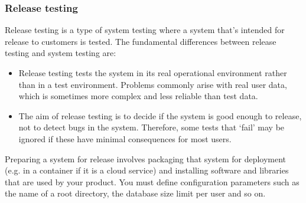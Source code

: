 \documentclass[10pt,a4paper]{report}
\begin{document}
\subsubsection{Release testing}
Release testing is a type of system testing where a system that’s intended for release to customers is tested. The fundamental differences between release testing and system testing are:
\begin{itemize}
	\item Release testing tests the system in its real operational environment rather than in a
	test environment. Problems commonly arise with real user data, which is sometimes
	more complex and less reliable than test data.
	\item The aim of release testing is to decide if the system is good enough to release, not to
	detect bugs in the system. Therefore, some tests that ‘fail’ may be ignored if these
	have minimal consequences for most users.
\end{itemize}

Preparing a system for release involves packaging that system for deployment (e.g. in a container if it is a cloud service) and installing software and libraries that are used by your product. You must define configuration parameters such as the name of a root directory, the database size limit per user and so on.
\end{document}
